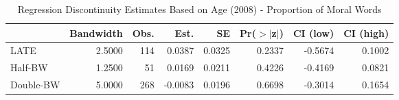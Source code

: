 \begin{table}[ht]
\centering
\begin{tabular}{lrrrrrrr}
  \hline
 & Bandwidth & Obs. & Est. & SE & Pr($>$$|$z$|$) & CI (low) & CI (high) \\ 
  \hline
LATE & 2.5000 & 114 & 0.0387 & 0.0325 & 0.2337 & -0.5674 & 0.1002 \\ 
  Half-BW & 1.2500 & 51 & 0.0169 & 0.0211 & 0.4226 & -0.4169 & 0.0821 \\ 
  Double-BW & 5.0000 & 268 & -0.0083 & 0.0196 & 0.6698 & -0.3014 & 0.1654 \\ 
   \hline
\end{tabular}
\caption{Regression Discontinuity Estimates Based on Age (2008) - Proportion of Moral Words} 
\label{tab:Xrd2008y}
\end{table}
